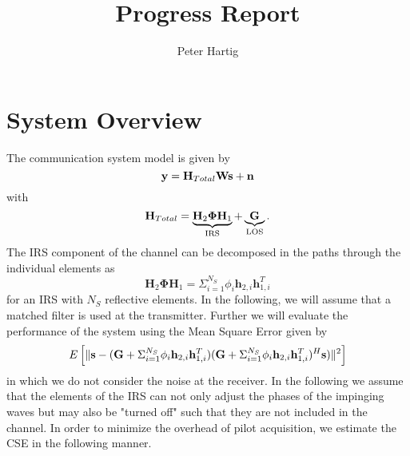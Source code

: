 \documentclass[12pt,a4paper]{report}
\title{Progress Report}
\author{Peter Hartig}
\begin{document}
\maketitle
\tableofcontents
\section{System Overview}
The communication system model is given by 
\begin{equation}
\mathbf{y} = \mathbf{H}_{Total} \mathbf{W} \mathbf{s}  + \mathbf{n}
\end{equation}
with 
	\begin{equation*}
	\mathbf{H}_{Total} = \underbrace{\mathbf{H}_{2}\boldsymbol{\Phi}\mathbf{H}_{1}}_{\text{IRS}} + \underbrace{\mathbf{G}}_{\text{LOS}}.
	\end{equation*}
	The IRS component of the channel can be decomposed in the paths through the individual elements as
	\begin{equation}
	\mathbf{H}_{2}\boldsymbol{\Phi}\mathbf{H}_{1}= 
	\Sigma_{i=1}^{N_S} \phi_i \mathbf{h}_{2,i}\mathbf{h}^T_{1,i}
	\end{equation}
	for an IRS with $N_S$ reflective elements. 
In the following, we will assume that a matched filter is used at the transmitter. Further we will evaluate the performance of the system using the Mean Square Error given by 
\begin{equation}
E\left[\|  \mathbf{s} - (\mathbf{G} + \Sigma_{i=1}^{N_S} \phi_i \mathbf{h}_{2,i}\mathbf{h}^T_{1,i})(\mathbf{G} + \Sigma_{i=1}^{N_S} \phi_i \mathbf{h}_{2,i}\mathbf{h}^T_{1,i})^H\mathbf{s}) \|^2 \right]
\end{equation}
in which we do not consider the noise at the receiver. 
In the following we assume that the elements of the IRS can not only adjust the phases of the impinging waves but may also be "turned off" such that they are not included in the channel.
In order to minimize the overhead of pilot acquisition, we estimate the CSE in the following manner. 
\end{document}
